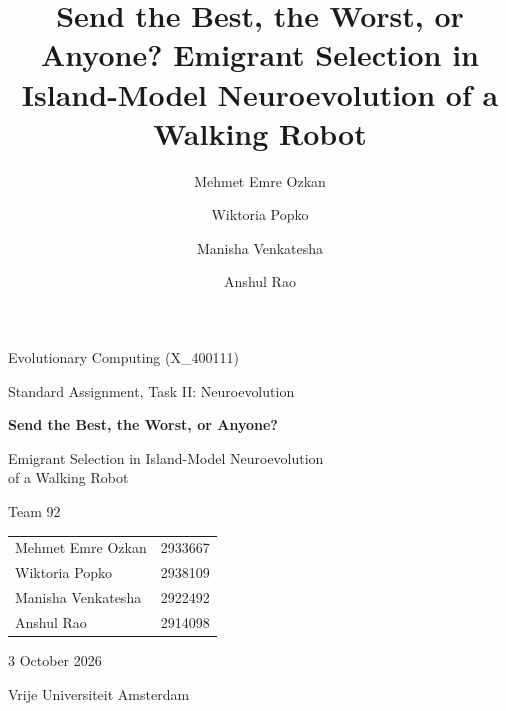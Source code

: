 \documentclass[sigconf]{acmart}
\begin{document}
\begin{titlepage}
  \centering
  \vspace*{3cm}
  {\Large Evolutionary Computing (X\_400111)\par}
  \vspace{0.6cm}
  {\large Standard Assignment, Task II: Neuroevolution\par}
  \vspace{1.6cm}
  {\LARGE\bfseries Send the Best, the Worst, or Anyone?\par}
  \vspace{0.3cm}
  {\Large Emigrant Selection in Island-Model Neuroevolution\\ of a Walking Robot\par}
  \vspace{1.6cm}
  {\large Team 92\par}
  \vspace{0.8cm}
  \begin{tabular}{ll}
    Mehmet Emre Ozkan & 2933667 \\
    Wiktoria Popko    & 2938109 \\
    Manisha Venkatesha & 2922492 \\
    Anshul Rao        & 2914098 \\
  \end{tabular}\par
  \vfill
  {\large 3 October 2026\par}
  \vspace{1cm}
  Vrije Universiteit Amsterdam
\end{titlepage}

\title{Send the Best, the Worst, or Anyone? Emigrant Selection in Island-Model
Neuroevolution of a Walking Robot}

\author{Mehmet Emre Ozkan}
\author{Wiktoria Popko}
\author{Manisha Venkatesha}
\author{Anshul Rao}
\renewcommand{\shortauthors}{Ozkan, Popko, Venkatesha and Rao}
\end{document}
